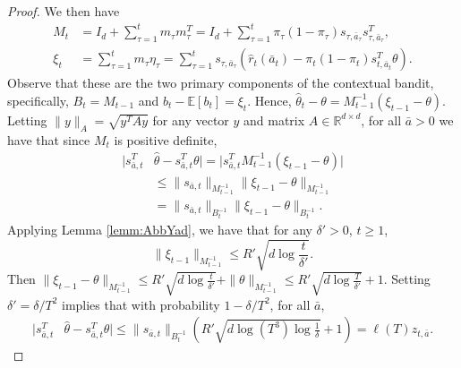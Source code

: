 \documentclass{article}
\begin{document}
\begin{appendices}
\begin{proof}
We then have
\begin{align*}
M_t &= I_d + \sum_{\tau = 1}^t m_{\tau} m_{\tau}^T = I_d + \sum_{\tau = 1}^t \pi_\tau (1-\pi_\tau)s_{\tau, \bar{a}_\tau}s_{\tau, \bar{a}_\tau}^T,\\
\xi_t &= \sum_{\tau = 1}^t m_\tau \eta_\tau = \sum_{\tau = 1}^t s_{\tau,\bar{a}_\tau} \left(\hat{r}_t(\bar{a}_t) - {\pi_t(1-\pi_t)} s_{t,\bar{a}_t}^T \theta\right).
\end{align*}
Observe that these are the two primary components of the contextual bandit, specifically, $B_t = M_{t-1}$ and $b_t - \mathbb{E}[b_t] = \xi_t$. Hence, $\hat{\theta}_t  - \theta = M_{t-1}^{-1} (\xi_{t-1} - \theta)$. Letting $\|y\|_A = \sqrt{y^T A y}$ for any vector $y$ and matrix $A \in \mathbb{R}^{d\times d}$, for all $\bar{a}>0$ we have that since $M_t$ is positive definite,
\begin{align*}
|s_{\bar{a},t}^T &\hat{\theta} - s_{\bar{a},t}^T {\theta}| = |s_{\bar{a},t}^T M^{-1}_{t-1} (\xi_{t-1} - \theta)|\\
 &\leq \|s_{\bar{a},t} \|_{M_{t-1}^{-1}} \|\xi_{t-1} - \theta\|_{M_{t-1}^{-1}}\\
 &= \|s_{\bar{a},t} \|_{B_{t}^{-1}} \|\xi_{t-1} - \theta\|_{B_{t}^{-1}}.
\end{align*}
Applying Lemma \ref{lemm:AbbYad}, we have that for any $\delta' > 0$, $t \geq 1$, 
\[
\|\xi_{t-1}\|_{M_{t-1}^{-1}}  \leq R' \sqrt{d \log \frac{t}{\delta'}}.
\]
Then $\|\xi_{t-1} - \theta\|_{M_{t-1}^{-1}}\leq R' \sqrt{d \log \frac{t}{\delta'}} + \|\theta\|_{M_{t-1}^{-1}} \leq R'\sqrt{d \log \frac{T}{\delta'}} + 1$. Setting $\delta'  = \delta/T^2$ implies that with probability $1 - \delta/T^2$, for all $\bar{a}$, 
\begin{align*}
|s_{\bar{a},t}^T &\hat{\theta} - s_{\bar{a},t}^T {\theta}| \leq \|s_{\bar{a},t} \|_{B_{t}^{-1}} \left(R'\sqrt{d \log (T^3) \log \frac{1}{\delta}} + 1\right)= \ell(T) z_{t,\bar{a}}.
\end{align*}
\end{proof}




\end{appendices}
\end{document}
